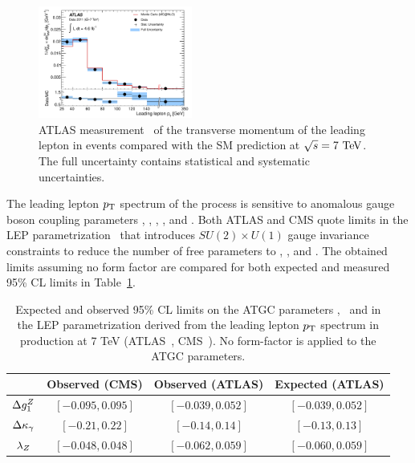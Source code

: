 % 
\begin{figure}[htbp]
  \begin{center}
  \includegraphics[width=0.45\textwidth]{figures/sss-inclboson-diboson-wwprod-pt-fiducial.pdf}
  \caption{ATLAS measurement~\cite{ATLAS:2012mec} of the transverse momentum of the leading lepton in \WW events compared with the SM prediction at $\rts = 7\TeV$. The full uncertainty contains statistical and systematic uncertainties.}
\label{fig:sss-WWprod-pt-fiducial}
\end{center}
\end{figure}


The leading lepton $p_{\mathrm{T}}$ spectrum of the \WW process is sensitive to anomalous gauge boson coupling parameters
\dkg,  \dkz, \lg, \lz, and \dgz. Both ATLAS and CMS quote limits in the LEP 
parametrization~\cite{Gounaris:1996rz} that introduces $SU(2) \times U(1)$ gauge invariance 
constraints to reduce the number of free parameters to \dgz,  \dkg, and \lz. The obtained limits assuming 
no form factor are compared for both expected and measured 95\% CL limits in Table~\ref{tab:sss-WZprod-ATGC}.

\begin{table}\centering
\begin{tabular}{cccc}
\hline
& Observed (CMS) & Observed (ATLAS) & Expected (ATLAS)\\
\hline
$\Delta g_1^Z$ & $[-0.095, 0.095]$ & $[-0.039, 0.052]$ & $[-0.039, 0.052]$ \\
$\Delta \kappa_\gamma$ & $[-0.21, 0.22]$ & $[-0.14, 0.14 ]$ & $[-0.13, 0.13]$ \\
$\lambda_Z$ & $[-0.048, 0.048]$ & $[-0.062, 0.059]$ & $[-0.060, 0.059]$ \\
\hline
\end{tabular}
\caption{Expected and observed 95\% CL limits on the ATGC parameters 
\dkg, \lz\ and \dgz\; in the LEP parametrization derived from the leading lepton $p_{\mathrm{T}}$ spectrum in \WW production at 7 TeV (ATLAS~\cite{ATLAS:2012mec}, CMS~\cite{Chatrchyan:2013yaa}). No form-factor is applied to the ATGC parameters.}
\label{tab:sss-WZprod-ATGC}
\end{table}





